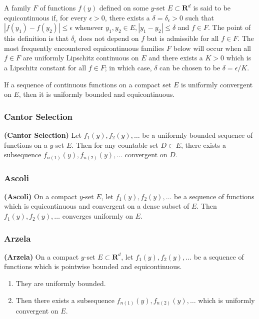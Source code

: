 \documentclass{article}
\newcommand{\bfs}[1]{\textbf{({#1}) }}
\begin{document}
A family $F$ of functions $f(y)$ defined on some $y$-set $E \subset \mathbf{R}^{d}$ is said to be equicontinuous if, for every $\epsilon>0$, there exists a $\delta=\delta_{\epsilon}>0$ such that $\left|f\left(y_{1}\right)-f\left(y_{2}\right)\right| \le \epsilon$ whenever $y_{1}, y_{2} \in E,\left|y_{1}-y_{2}\right| \le \delta$ and $f \in F$. The point of this definition is that $\delta_{\epsilon}$ does not depend on $f$ but is admissible for all $f \in F$. The most frequently encountered equicontinuous families $F$ below will occur when all $f \in F$ are uniformly Lipschitz continuous on $E$ and there exists a $K>0$ which is a Lipschitz constant for all $f \in F$; in which case, $\delta$ can be chosen to be $\delta=\epsilon / K$.

\begin{lema}\label{lem:efda}
If a sequence of continuous functions on a compact set $E$ is uniformly convergent on $E$, then it is uniformly bounded and equicontinuous.
\end{lema}
\subsubsection{Cantor Selection}
\begin{thma}\bfs{Cantor Selection}
Let $f_{1}(y), f_{2}(y), \ldots$ be a uniformly bounded sequence of functions on a $y$-set $E$. Then for any countable set $D \subset E$, there exists a subsequence $f_{n(1)}(y), f_{n(2)}(y), \ldots$ convergent on $D .$
\end{thma} 

\subsubsection{Ascoli}
\begin{thma}\bfs{Ascoli}\label{thm:Ascoli}
On a compact $y$-set $E$, let $f_{1}(y), f_{2}(y), \ldots$ be a sequence of functions which is equicontinuous and convergent on a dense subset of $E$. Then $f_{1}(y), f_{2}(y), \ldots$ converges uniformly on $E$.
\end{thma}
\subsubsection{Arzela}
\begin{thma}\bfs{Arzela}\label{thm:Arzela} On a compact $y$-set $E \subset \mathbf{R}^{d}$, let $f_{1}(y), f_{2}(y), \ldots$ be a sequence of functions which is pointwise bounded and equicontinuous.
\begin{enumerate}
\item They are uniformly bounded.
    \item Then there exists a subsequence $f_{n(1)}(y), f_{n(2)}(y), \ldots$ which is uniformly convergent on $E$.
\end{enumerate}
\end{thma}
\end{document}
